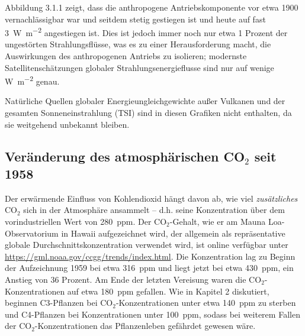 \documentclass[12pt,paper=a4,DIV=12,parskip=never,chapterprefix=false,headings=standardclasses]{scrreprt}
\begin{document}
Abbildung 3.1.1 zeigt, dass die anthropogene Antriebskomponente vor etwa 1900 vernachlässigbar war und seitdem stetig gestiegen ist und heute auf fast \SI{3}{\watt\per\square\meter} angestiegen ist. Dies ist jedoch immer noch nur etwa 1 Prozent der ungestörten Strahlungsflüsse, was es zu einer Herausforderung macht, die Auswirkungen des anthropogenen Antriebs zu isolieren; modernste Satellitenschätzungen globaler Strahlungsenergieflusse sind nur auf wenige \si{\watt\per\square\meter} genau.

Natürliche Quellen globaler Energieungleichgewichte außer Vulkanen und der gesamten Sonneneinstrahlung (TSI) sind in diesen Grafiken nicht enthalten, da sie weitgehend unbekannt bleiben.

\subsection{Veränderung des atmosphärischen CO$_2$ seit 1958}

Der erwärmende Einfluss von Kohlendioxid hängt davon ab, wie viel \emph{zusätzliches} CO$_2$ sich in der Atmosphäre ansammelt – d.h. seine Konzentration über dem vorindustriellen Wert von \SI{280}{ppm}. Der CO$_2$-Gehalt, wie er am Mauna Loa-Observatorium in Hawaii aufgezeichnet wird, der allgemein als repräsentative globale Durchschnittskonzentration verwendet wird, ist online verfügbar unter \url{https://gml.noaa.gov/ccgg/trends/index.html}. Die Konzentration lag zu Beginn der Aufzeichnung 1959 bei etwa \SI{316}{ppm} und liegt jetzt bei etwa \SI{430}{ppm}, ein Anstieg von 36 Prozent. Am Ende der letzten Vereisung waren die CO$_2$-Konzentrationen auf etwa \SI{180}{ppm} gefallen. Wie in Kapitel 2 diskutiert, beginnen C3-Pflanzen bei CO$_2$-Konzentrationen unter etwa \SI{140}{ppm} zu sterben und C4-Pflanzen bei Konzentrationen unter \SI{100}{ppm}, sodass bei weiterem Fallen der CO$_2$-Konzentrationen das Pflanzenleben gefährdet gewesen wäre.
\end{document}
